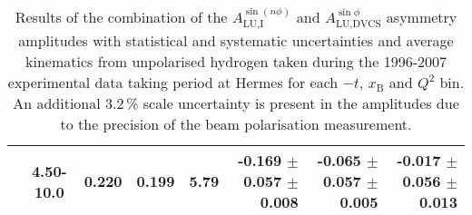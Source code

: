 \begin{table}[width=15cm]
\begin{center}
{\begin{tabular}{|c|c|c|c|c|r|r|r|}
& 4.50-10.0 &  0.220 & 0.199 &  5.79  &  -0.169 $\pm$ 0.057  $\pm$   0.008 &
-0.065  $\pm$  0.057 $\pm$ 0.005 & -0.017  $\pm$  0.056  $\pm$  0.013\\
\hline
  \end{tabular}
}
 \end{center}
\caption{Results of the combination of the $A_{\textrm{LU,I}}^{\sin(n\phi)}$ and $A_{\textrm{LU,DVCS}}^{\sin \phi}$ asymmetry amplitudes with statistical and systematic uncertainties and average kinematics from unpolarised hydrogen taken during
the 1996-2007 experimental data taking period at H{\sc ermes} for each $-t$, $x_{\textrm{B}}$ and $Q^{2}$ bin.
An additional 3.2\,\% scale uncertainty is present in the amplitudes due to the precision of
the beam polarisation measurement.
}
\end{table}


